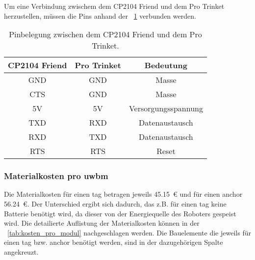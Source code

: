 Um eine Verbindung zwischem dem CP2104 Friend und dem Pro Trinket herzustellen, müssen die Pins anhand der \tablename~\ref{tab:pin_assignment_between_cp2104_and_pro_trinket} verbunden werden.

\begin{table}
	\centering
	\begin{tabular}{||c|c|c||} 
		\hline
		CP2104 Friend & Pro Trinket & Bedeutung\\\hline
		\hline
		GND & GND & Masse\\\hline
		CTS & GND & Masse\\\hline
		\hline
		5V & 5V & Versorgungsspannung\\\hline
		\hline
		TXD & RXD & Datenaustausch\\\hline
		RXD & TXD & Datenaustausch\\\hline
		\hline
		RTS & RTS & Reset\\\hline
	\end{tabular}
	\caption{Pinbelegung zwischen dem CP2104 Friend und dem Pro Trinket.}
	\label{tab:pin_assignment_between_cp2104_and_pro_trinket}
\end{table}


\begin{comment}
- Kosten für den Aufbau
------------------------------------------------------------------------------------------
\end{comment}
\subsubsection{Materialkosten pro \gls{uwbm}}

Die Materialkosten für einen \gls{tag} betragen jeweils \SI{45.15}{\euro} und für einen \gls{anchor} \SI{56.24}{\euro}. Der Unterschied ergibt sich dadurch, das z.B. für einen \gls{tag} keine Batterie benötigt wird, da dieser von der Energiequelle des Roboters gespeist wird.
Die detailierte Auflistung der Materialkosten können in der \tablename~\ref{tab:kosten_pro_modul} nachgeschlagen werden. Die Bauelemente die jeweils für einen \gls{tag} bzw. \gls{anchor} benötigt werden, sind in der dazugehörigen Spalte angekreuzt.

